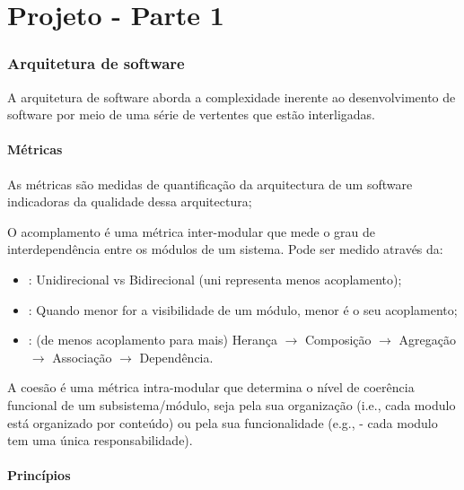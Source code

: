 \chapter{Projeto - Parte 1} \label{ch:projeto-parte1}

\subsection{Arquitetura de software}\label{subsec:arquitetura-de-software}

A arquitetura de software aborda a complexidade inerente ao desenvolvimento de software por meio de uma série de vertentes que estão interligadas. 

\subsubsection{Métricas}\label{subsubsec:acoplamento}

As métricas são medidas de quantificação da arquitectura de um software indicadoras da qualidade dessa arquitectura;

O acomplamento é uma métrica inter-modular que mede o grau de interdependência entre os módulos de um sistema. Pode ser medido através da:
\begin{itemize}[topsep=0pt,itemsep=0pt,partopsep=0pt, parsep=0pt]
    \item {}: Unidirecional vs Bidirecional (uni representa menos acoplamento);
    \item {}: Quando menor for a visibilidade de um módulo, menor é o  seu acoplamento;
    \item {}: (de menos acoplamento para mais) Herança $\rightarrow$ Composição $\rightarrow$ Agregação $\rightarrow$ Associação $\rightarrow$ Dependência.
\end{itemize}

A coesão é uma métrica intra-modular que determina o nível de coerência funcional de um subsistema/módulo, seja pela sua organização (i.e., cada modulo está organizado por conteúdo) ou pela sua funcionalidade (e.g.,  - cada modulo tem uma única responsabilidade).

\subsubsection{Princípios}\label{subsubsec:principios}

